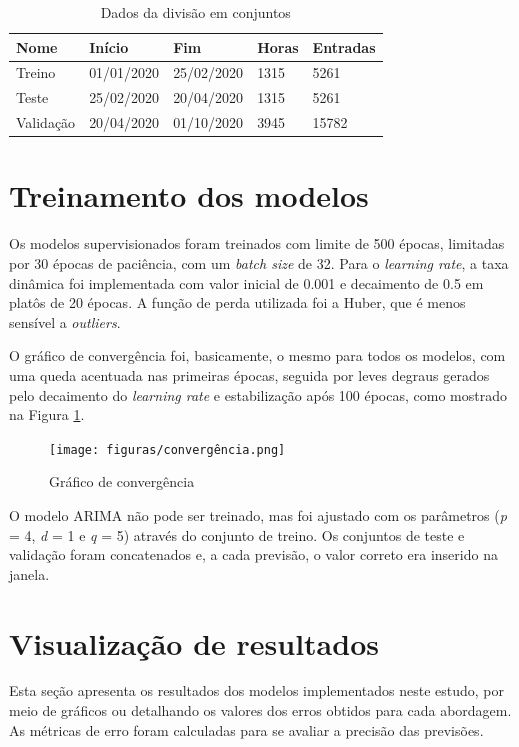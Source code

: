 \begin{table}[!htb]
    \caption{Dados da divisão em conjuntos} \label{tab:conjuntos}
    \begin{tabularx}{\textwidth}{X|X|X|X|X}
    \hline
    Nome & Início & Fim & Horas & Entradas \\ \hline
    Treino   & 01/01/2020      & 25/02/2020            & 1315      & 5261          \\ \hline
    Teste   & 25/02/2020     & 20/04/2020            & 1315     & 5261         \\ \hline
    Validação   & 20/04/2020      & 01/10/2020             & 3945     & 15782         \\ \hline
    \end{tabularx}
\end{table}

\section{Treinamento dos modelos}
Os modelos supervisionados foram treinados com limite de 500 épocas, limitadas por 30 épocas de paciência, com um \textit{batch size} de 32.
Para o \textit{learning rate}, a taxa dinâmica foi implementada com valor inicial de 0.001 e decaimento de 0.5 em platôs de 20 épocas.
A função de perda utilizada foi a Huber, que é menos sensível a \textit{outliers}.

O gráfico de convergência foi, basicamente, o mesmo para todos os modelos, com uma queda acentuada nas primeiras épocas, seguida por leves degraus gerados pelo decaimento do \textit{learning rate}
e estabilização após 100 épocas, como mostrado na Figura \ref{figura:convergencia}.

\begin{figure}[!htb] \centering
    \caption{Gráfico de convergência} \label{figura:convergencia}
    \begin{varwidth}{\linewidth}
      \texttt{[image: figuras/convergência.png]}
    \end{varwidth}
  \end{figure}

O modelo ARIMA não pode ser treinado, mas foi ajustado com os parâmetros (\textit{p} = 4, \textit{d} = 1 e \textit{q} = 5) através do conjunto de treino. Os conjuntos de teste e validação foram concatenados e, a cada previsão, o valor correto era inserido na janela.

\section{Visualização de resultados}
Esta seção apresenta os resultados dos modelos implementados neste estudo, por meio de gráficos ou detalhando os valores dos erros obtidos para cada abordagem. As métricas de erro foram calculadas para se avaliar a precisão das previsões.

